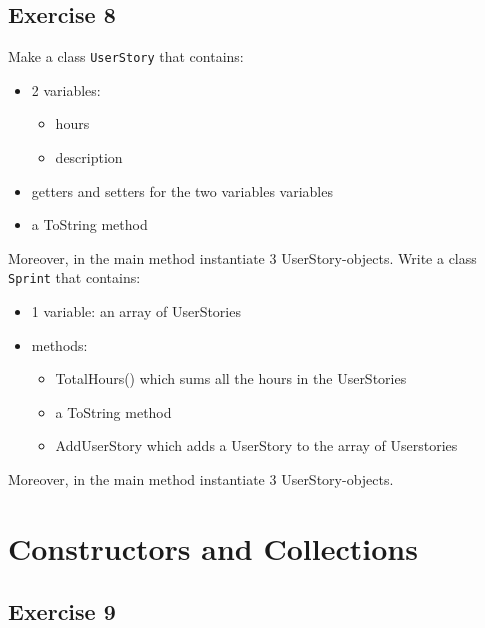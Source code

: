 \subsection{Exercise 8}
Make a class \texttt{UserStory} that contains:
                \begin{itemize}
                    \item 2 variables:
                        \begin{itemize}
                            \item hours
                            \item description
                        \end{itemize}

                        \item getters and setters for the two variables variables
                        \item a ToString method
                \end{itemize}
\noindent
Moreover, in the main method instantiate 3 UserStory-objects.
\vspace{0.5cm}
\noindent
Write a class \texttt{Sprint} that contains:
                 \begin{itemize}
                    \item 1 variable: an array of UserStories
                    \item methods:
                    \begin{itemize}
                        \item TotalHours() which sums all the hours in the UserStories
                        \item a ToString method
                        \item AddUserStory which adds a UserStory to the array of Userstories
                \end{itemize}
            \end{itemize}
\noindent
Moreover, in the main method instantiate 3 UserStory-objects.        

\section{Constructors and Collections}
\subsection{Exercise 9}


